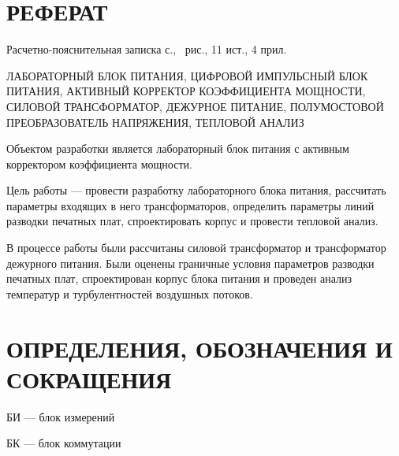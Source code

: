 \documentclass[utf8x, 14pt, oneside, a4paper]{article}
\begin{document}
	\normalsize
	\setcounter{page}{2}
	
	\titleformat{\section}[display]
	{\normalfont\normalsize\bfseries}{}{0pt}{\normalsize\centering}
	
	
	\section*{РЕФЕРАТ}
	
	\begin{center}
		Расчетно-пояснительная записка \pageref{LastPage} с., \totalfigures\ рис., 11 ист., 4 прил.
	\end{center}

	\noindent ЛАБОРАТОРНЫЙ БЛОК ПИТАНИЯ, ЦИФРОВОЙ ИМПУЛЬСНЫЙ БЛОК ПИТАНИЯ, АКТИВНЫЙ КОРРЕКТОР КОЭФФИЦИЕНТА МОЩНОСТИ, СИЛОВОЙ ТРАНСФОРМАТОР, ДЕЖУРНОЕ ПИТАНИЕ, ПОЛУМОСТОВОЙ ПРЕОБРАЗОВАТЕЛЬ НАПРЯЖЕНИЯ, ТЕПЛОВОЙ АНАЛИЗ
	
	Объектом разработки является лабораторный блок питания с активным корректором коэффициента мощности.
	
	Цель работы --- провести разработку лабораторного блока питания, рассчитать параметры входящих в него трансформаторов, определить параметры линий разводки печатных плат, спроектировать корпус и провести тепловой анализ.
	
	В процессе работы были рассчитаны силовой трансформатор и трансформатор дежурного питания. Были оценены граничные условия параметров разводки печатных плат, спроектирован корпус блока питания и проведен анализ температур и турбулентностей воздушных потоков.
				
	\pagebreak
	
	\begin{center}
		\renewcommand{\contentsname}{\normalsize\bfseries\centering СОДЕРЖАНИЕ}
		\normalsize
		\tableofcontents
		\normalsize
	\end{center}
	
	\pagebreak
	
	
	\section*{ОПРЕДЕЛЕНИЯ, ОБОЗНАЧЕНИЯ И СОКРАЩЕНИЯ}
	
	БИ --- блок измерений
	
	БК --- блок коммутации
	
\end{document}
